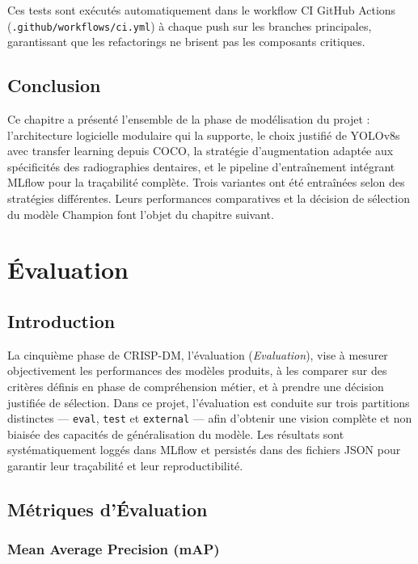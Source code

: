 \documentclass{rapportENSIAS}
\begin{document}
Ces tests sont exécutés automatiquement dans le workflow CI GitHub Actions
(\texttt{.github/workflows/ci.yml}) à chaque push sur les branches principales,
garantissant que les refactorings ne brisent pas les composants critiques.

\section{Conclusion}

Ce chapitre a présenté l'ensemble de la phase de modélisation du projet :
l'architecture logicielle modulaire qui la supporte, le choix justifié de
YOLOv8s avec transfer learning depuis COCO, la stratégie d'augmentation
adaptée aux spécificités des radiographies dentaires, et le pipeline
d'entraînement intégrant MLflow pour la traçabilité complète. Trois variantes
ont été entraînées selon des stratégies différentes. Leurs performances
comparatives et la décision de sélection du modèle Champion font l'objet
du chapitre suivant.


\chapter{Évaluation}
\label{chap:evaluation}

\section{Introduction}

La cinquième phase de CRISP-DM, l'évaluation (\textit{Evaluation}), vise à
mesurer objectivement les performances des modèles produits, à les comparer
sur des critères définis en phase de compréhension métier, et à prendre une
décision justifiée de sélection. Dans ce projet, l'évaluation est conduite
sur trois partitions distinctes — \texttt{eval}, \texttt{test} et
\texttt{external} — afin d'obtenir une vision complète et non biaisée
des capacités de généralisation du modèle. Les résultats sont systématiquement
loggés dans MLflow et persistés dans des fichiers JSON pour garantir leur
traçabilité et leur reproductibilité.

\section{Métriques d'Évaluation}

\subsection{Mean Average Precision (mAP)}
\end{document}
